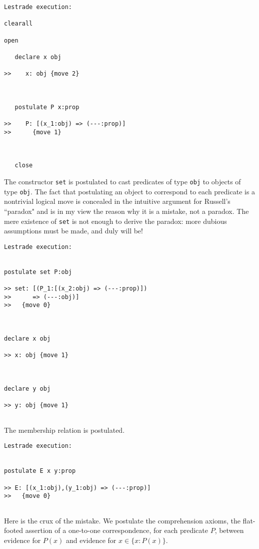 \documentclass[12pt]{article}
\begin{document}
\newpage

\begin{verbatim}Lestrade execution:

clearall

open

   declare x obj

>>    x: obj {move 2}



   postulate P x:prop

>>    P: [(x_1:obj) => (---:prop)]
>>      {move 1}



   close
\end{verbatim}

The constructor {\tt set} is postulated to cast predicates of type {\tt obj} to objects of type {\tt obj}.  The fact that postulating an object to correspond to each predicate is a nontrivial logical move is concealed in the intuitive argument for Russell's ``paradox"  and is in my view the reason why it is a mistake, not a paradox.  The mere existence of {\tt set} is not enough to derive the paradox:  more dubious assumptions must be made, and duly will be!

\begin{verbatim}Lestrade execution:


postulate set P:obj

>> set: [(P_1:[(x_2:obj) => (---:prop)])
>>      => (---:obj)]
>>   {move 0}



declare x obj

>> x: obj {move 1}



declare y obj

>> y: obj {move 1}


\end{verbatim}

The membership relation is postulated.

\begin{verbatim}Lestrade execution:


postulate E x y:prop

>> E: [(x_1:obj),(y_1:obj) => (---:prop)]
>>   {move 0}


\end{verbatim}

Here is the crux of the mistake.  We postulate the comprehension axioms, the flat-footed assertion of a one-to-one correspondence, for each predicate $P$, between evidence
for $P(x)$ and evidence for $x \in \{x:P(x)\}$.
\end{document}
